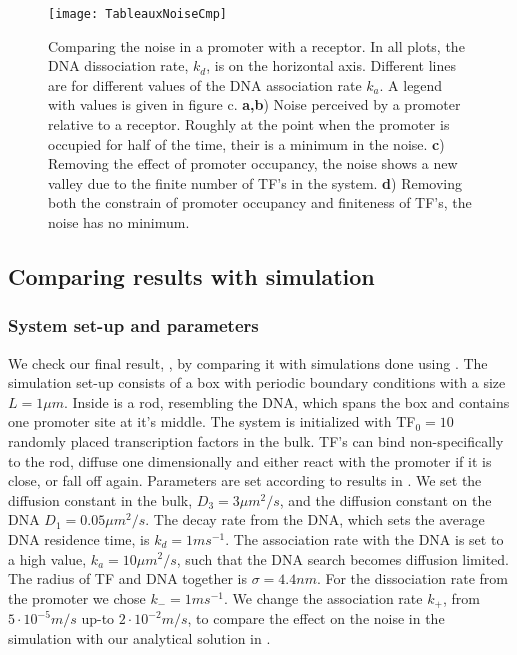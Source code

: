 \begin{figure}
\texttt{[image: TableauxNoiseCmp]}
\caption{ Comparing the noise in a promoter with a receptor. In all plots, the DNA dissociation rate, $k_d$, is on the horizontal axis. Different lines are for different values of the DNA association rate $k_a$. A legend with values is given in figure c. {\bf a,b}) Noise perceived by a promoter relative to a receptor. Roughly at the point when the promoter is occupied for half of the time, their is a minimum in the noise. {\bf c}) Removing the effect of promoter occupancy, the noise shows a new valley due to the finite number of TF's in the system. {\bf d}) Removing both the constrain of promoter occupancy and finiteness of TF's, the noise has no minimum.
}
\end{figure}



\subsection{Comparing results with simulation}

\subsubsection{System set-up and parameters}
We check our final result, , by comparing it with simulations done using \GFRD. The simulation set-up consists of a box with periodic boundary conditions with a size $L=1\mu m$. Inside is a rod, resembling the DNA, which spans the box and contains one promoter site at it's middle. The system is initialized with TF$_0=10$ randomly placed transcription factors in the bulk. TF's can bind non-specifically to the rod, diffuse one dimensionally and either react with the promoter if it is close, or fall off again. Parameters are set according to results in \cite{Elf2007a}. We set the diffusion constant in the bulk, $D_3=3 \mu m^2/s$, and the diffusion constant on the DNA $D_1=0.05 \mu m^2/s$. The decay rate from the DNA, which sets the average DNA residence time, is $k_d=1ms^{-1}$. The association rate with the DNA is set to a high value, $k_a=10\mu m^2/s$, such that the DNA search becomes diffusion limited. The radius of TF and DNA together is $\sigma=4.4nm$. For the dissociation rate from the promoter we chose $k_-=1 ms^{-1}$. We change the association rate $k_+$, from $5\cdot10^{-5} m/s$ up-to $2\cdot10^{-2} m/s$, to compare the effect on the noise in the simulation with our analytical solution in . 

